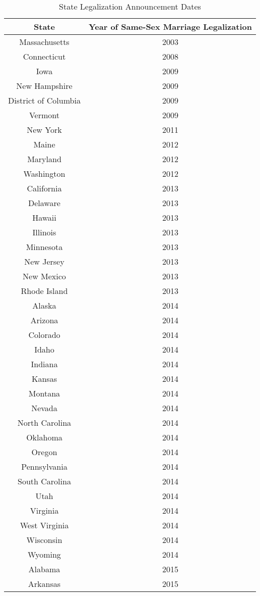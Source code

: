 \begin{spacing}{1}
\begin{longtable}{|c|c|} %
\caption{State Legalization Announcement Dates}
\label{tab:legal_date} 
\hline
\textbf{State} & \textbf{Year of Same-Sex Marriage Legalization} \\
\hline
Massachusetts & 2003 \\
Connecticut & 2008 \\
Iowa & 2009 \\
New Hampshire & 2009 \\
District of Columbia & 2009 \\
Vermont & 2009 \\
New York & 2011 \\
Maine & 2012 \\
Maryland & 2012 \\
Washington & 2012 \\
California & 2013 \\
Delaware & 2013 \\
Hawaii & 2013 \\
Illinois & 2013 \\
Minnesota & 2013 \\
New Jersey & 2013 \\
New Mexico & 2013 \\
Rhode Island & 2013 \\
Alaska & 2014 \\
Arizona & 2014 \\
Colorado & 2014 \\
Idaho & 2014 \\
Indiana & 2014 \\
Kansas & 2014 \\
Montana & 2014 \\
Nevada & 2014 \\
North Carolina & 2014 \\
Oklahoma & 2014 \\
Oregon & 2014 \\
Pennsylvania & 2014 \\
South Carolina & 2014 \\
Utah & 2014 \\
Virginia & 2014 \\
West Virginia & 2014 \\
Wisconsin & 2014 \\
Wyoming & 2014 \\
Alabama & 2015 \\
Arkansas & 2015 \\

\end{longtable}
\end{spacing}

